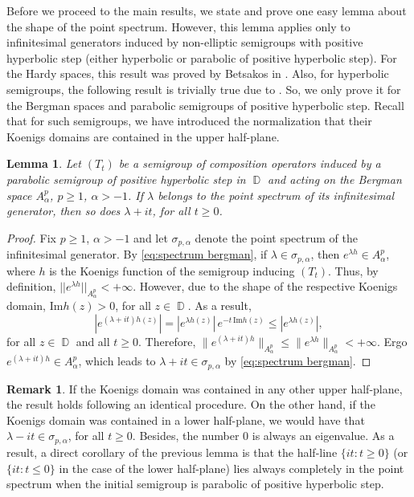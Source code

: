 \documentclass[11pt]{amsart}
\numberwithin{equation}{section}
\newtheorem{lemma}[theorem]{Lemma}
\theoremstyle{definition}
\newtheorem{remark}[theorem]{Remark}
\DeclareMathOperator{\D}{\mathbb{D}}
\begin{document}
	Before we proceed to the main results, we state and prove one easy lemma about the shape of the point spectrum. However, this lemma applies only to infinitesimal generators induced by non-elliptic semigroups with positive hyperbolic step (either hyperbolic or parabolic of positive hyperbolic step). For the Hardy spaces, this result was proved by Betsakos in \cite{betsakos_eig}. Also, for hyperbolic semigroups, the following result is trivially true due to \cite{Betsakos_Bergman}. So, we only prove it for the Bergman spaces and parabolic semigroups of positive hyperbolic step. Recall that for such semigroups, we have introduced the normalization that their Koenigs domains are contained in the upper half-plane.
	\begin{lemma}\label{lm:convexity in the upper direction}
		Let $(T_t)$ be a semigroup of composition operators induced by a parabolic semigroup of positive hyperbolic step in $\D$ and acting on the Bergman space $A_\alpha^p$, $p\ge1$, $\alpha>-1$. If $\lambda$ belongs to the point spectrum of its infinitesimal generator, then so does $\lambda+it$, for all $t\ge0$.
	\end{lemma}
	\begin{proof}
		Fix $p\ge1$, $\alpha>-1$ and let $\sigma_{p,\alpha}$ denote the point spectrum of the infinitesimal generator. By \eqref{eq:spectrum bergman}, if $\lambda\in\sigma_{p,\alpha}$, then $e^{\lambda h}\in A_{\alpha}^p$, where $h$ is the Koenigs function of the semigroup inducing $(T_t)$. Thus, by definition, $||e^{\lambda h}||_{A_\alpha^p}<+\infty$. However, due to the shape of the respective Koenigs domain, $\mathrm{Im}h(z)>0$, for all $z\in\D$. As a result,
		\begin{equation*}
			\left|e^{(\lambda+it)h(z)}\right|=\left|e^{\lambda h(z)}\right| \, e^{-t\, \mathrm{Im}h(z)}\le \left|e^{\lambda h(z)}\right|,
		\end{equation*}
		for all $z\in\D$ and all $t\ge0$. Therefore, $\|e^{(\lambda+it)h}\|_{A^p_\alpha}\le \|e^{\lambda h}\|_{A^p_\alpha}<+\infty$. Ergo $e^{(\lambda+it)h}\in A_{\alpha}^p$, which leads to $\lambda+it\in\sigma_{p,\alpha}$ by \eqref{eq:spectrum bergman}.
	\end{proof}
	
	\begin{remark}
		If the Koenigs domain was contained in any other upper half-plane, the result holds following an identical procedure. On the other hand, if the Koenigs domain was contained in a lower half-plane, we would have that $\lambda-it\in\sigma_{p,\alpha}$, for all $t\ge0$. Besides, the number $0$ is always an eigenvalue. As a result, a direct corollary of the previous lemma is that the half-line $\{it:t\ge0\}$ (or $\{it:t\le0\}$ in the case of the lower half-plane) lies always completely in the point spectrum when the initial semigroup is parabolic of positive hyperbolic step.
	\end{remark}
	
\end{document}
